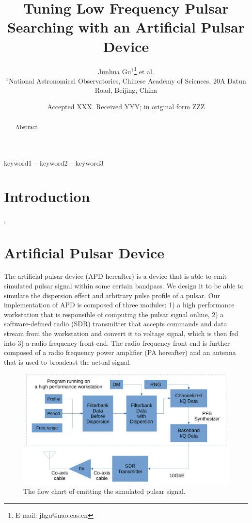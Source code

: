 \documentclass[fleqn,usenatbib]{mnras}
\title[Artificial Pulsar]{Tuning Low Frequency Pulsar Searching with an  Artificial Pulsar Device}
\author[J.-H. Gu et al.]{
Junhua Gu$^{1}$\thanks{E-mail: jhgu@nao.cas.cn} et al.
\\
$^{1}$National Astronomical Observatories, Chinese Academy of Sciences, 20A Datun Road, Beijing, China
}
\date{Accepted XXX. Received YYY; in original form ZZZ}
\begin{document}
\label{firstpage}
\pagerange{\pageref{firstpage}--\pageref{lastpage}}
\maketitle

\begin{abstract}
Abstract
\end{abstract}

\begin{keywords}
keyword1 -- keyword2 -- keyword3
\end{keywords}

\section{Introduction}
\citet{2017AAS...22915516P}, \citet{2011AAS...21723406S}

\section{Artificial Pulsar Device}
The artificial pulsar device (APD hereafter) is a device that is able to emit simulated pulsar signal within some certain bandpass.
We design it to be able to simulate the dispersion effect and arbitrary pulse profile of a pulsar.
Our implementation of APD is composed of three modules: 1) a high performance workstation that is responsible of computing the pulsar signal online, 2) a software-defined radio (SDR) transmitter that accepts commands and data stream from the workstation and convert it to voltage signal, which is then fed into 3) a radio frequency front-end. 
The radio frequency front-end is further composed of a radio frequency power amplifier (PA hereafter) and an antenna that is used to broadcast the actual signal.

\begin{figure}
    \centering
    \includegraphics[width=0.95\columnwidth]{flow_chart.pdf}
    \caption{The flow chart of emitting the simulated pulsar signal.
    }
    \label{fig:flow_chart}
\end{figure}
\end{document}
